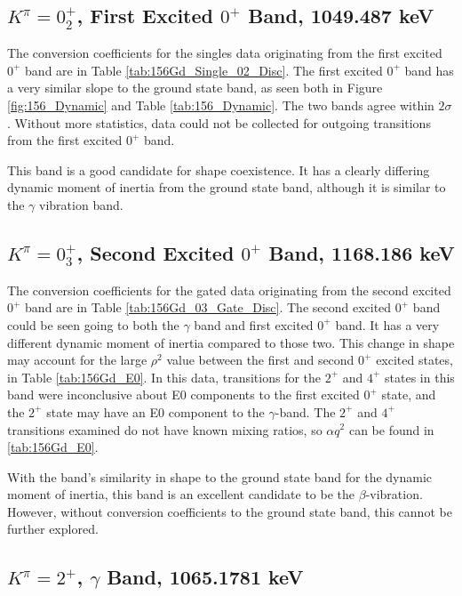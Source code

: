 \subsection{$K^{\pi}=0^+_2$, First Excited $0^+$ Band, 1049.487 keV}

The conversion coefficients for the singles data originating from the first excited $0^+$ band are in Table \ref{tab:156Gd_Single_02_Disc}. The first excited $0^+$ band has a very similar slope to the ground state band, as seen both in Figure \ref{fig:156_Dynamic} and Table \ref{tab:156_Dynamic}. The two bands agree within $2\sigma$. Without more statistics, data could not be collected for outgoing transitions from the first excited $0^+$ band.

This band is a good candidate for shape coexistence. It has a clearly differing dynamic moment of inertia from the ground state band, although it is similar to the $\gamma$ vibration band.



\subsection{$K^{\pi}=0^+_3$, Second Excited $0^+$ Band, 1168.186 keV}

The conversion coefficients for the gated data originating from the second excited $0^+$ band are in Table \ref{tab:156Gd_03_Gate_Disc}. The second excited $0^+$ band could be seen going to both the $\gamma$ band and first excited $0^+$ band. It has a very different dynamic moment of inertia compared to those two. This change in shape may account for the large $\rho^2$ value between the first and second $0^+$ excited states, in Table \ref{tab:156Gd_E0}. In this data, transitions for the $2^+$ and $4^+$ states in this band were inconclusive about E0 components to the first excited $0^+$ state, and the $2^+$ state may have an E0 component to the $\gamma$-band. The $2^+$ and $4^+$ transitions examined do not have known mixing ratios, so $\alpha q^2$ can be found in \ref{tab:156Gd_E0}.

With the band's similarity in shape to the ground state band for the dynamic moment of inertia, this band is an excellent candidate to be the $\beta$-vibration. However, without conversion coefficients to the ground state band, this cannot be further explored.



\subsection{$K^{\pi}=2^+$, $\gamma$ Band, 1065.1781 keV}

